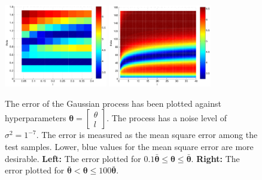 \documentclass[a4paper,11pt]{article}
\newcommand{\V}[1]{\ensuremath{\boldsymbol{#1}}}
\begin{document}
\begin{figure}
  \begin{center}
    \caption[The error of the Gaussian process has been plotted against hyperparameters $\theta, l$.]{The error of the Gaussian process has been plotted against hyperparameters $\V{\theta} = \begin{bmatrix}\theta\\ l\end{bmatrix}$.  The process has a noise level of $\sigma^2 = 1^{-7}$.  The error is measured as the mean square error among the test samples.  Lower, blue values for the mean square error are more desirable. \textbf{Left:} The error plotted for $0.1\V{\bar\theta} \leq \V{\theta} \leq \V{\bar\theta}$. \textbf{Right:} The error plotted for $\V{\bar\theta} < \V{\theta} \leq 100 \V{\bar\theta}$.}
    \label{fig:ex2plot2}
    \includegraphics[width=0.4\textwidth]{3dplotsmall}
    \includegraphics[width=0.4\textwidth]{3dplotlarge}
  \end{center}
\end{figure}
\end{document}
